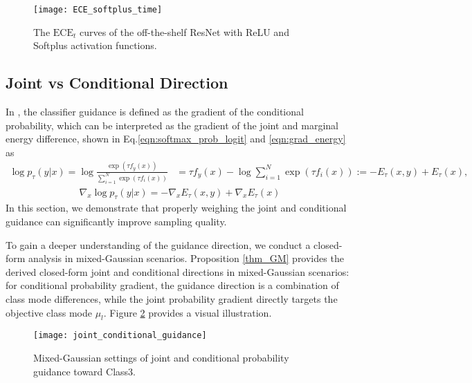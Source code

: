 \documentclass{article}
\theoremstyle{definition}
\begin{document}
\begin{figure}[h]
  \centering
\texttt{[image: ECE\_softplus\_time]}
  \caption{The $\text{ECE}_t$ curves of the off-the-shelf ResNet with ReLU and Softplus activation functions.}
  \label{fig:ECE_softplus_time}
\end{figure}


\subsection{Joint vs Conditional Direction}
In \cite{dhariwal2021diffusion}, the classifier guidance is defined as the gradient of the conditional probability, which can be interpreted as the gradient of the joint and marginal energy \citep{grathwohl2019your} difference, shown in Eq.\eqref{eqn:softmax_prob_logit} and \eqref{eqn:grad_energy} as
\begin{equation}
\begin{aligned}
\label{eqn:softmax_prob_logit}
\log p_\tau(y|x) = \log\frac{\exp(\tau f_y(x))}{\sum^N_{i=1} \exp(\tau f_i(x)) } & = \tau f_y(x) - \log{\sum^N_{i=1} \exp(\tau f_i(x))} := -E_\tau(x,y) + E_\tau(x), 
\end{aligned}
\end{equation}
\begin{equation}
    \begin{aligned}
        \label{eqn:grad_energy}
        \nabla_x \log p_\tau(y|x) = -\nabla_x E_\tau(x,y) + \nabla_x E_\tau(x)
    \end{aligned}
\end{equation}
In this section, we demonstrate that properly weighing the joint and conditional guidance can significantly improve sampling quality. 


To gain a deeper understanding of the guidance direction, we conduct a closed-form analysis in mixed-Gaussian scenarios. Proposition \ref{thm_GM} provides the derived closed-form joint and conditional directions in mixed-Gaussian scenarios: for conditional probability gradient, the guidance direction is a combination of class mode differences, while the joint probability gradient directly targets the objective class mode $\mu_l$. Figure \ref{fig:joint_conditional_guidance} provides a visual illustration. 


\begin{figure}[h]
  \centering
\texttt{[image: joint\_conditional\_guidance]}
  \caption{Mixed-Gaussian settings of joint and conditional probability guidance toward Class3.}
  \label{fig:joint_conditional_guidance}
\end{figure}
\end{document}
